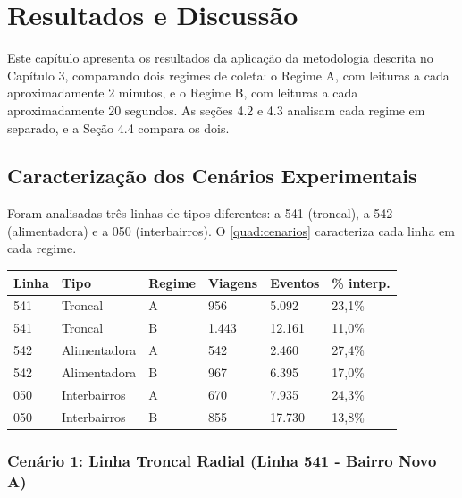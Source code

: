 
\chapter{Resultados e Discussão}\label{cap:resultados}

Este capítulo apresenta os resultados da aplicação da metodologia descrita no Capítulo 3, comparando dois regimes de coleta: o Regime A, com leituras a cada aproximadamente 2 minutos, e o Regime B, com leituras a cada aproximadamente 20 segundos. As seções 4.2 e 4.3 analisam cada regime em separado, e a Seção 4.4 compara os dois.

\section{Caracterização dos Cenários Experimentais}\label{sec:cenarios}

Foram analisadas três linhas de tipos diferentes: a 541 (troncal), a 542 (alimentadora) e a 050 (interbairros). O \autoref{quad:cenarios} caracteriza cada linha em cada regime.

\begin{tabframed}[htb]
\caption{Caracterização dos cenários experimentais}
\label{quad:cenarios}
\footnotesize
\begin{tabular}{|p{1.4cm}|p{2.8cm}|p{1.6cm}|p{1.8cm}|p{1.9cm}|p{1.9cm}|}
\hline
\textbf{Linha} & \textbf{Tipo} & \textbf{Regime} & \textbf{Viagens} & \textbf{Eventos} & \textbf{\% interp.} \\ \hline
541 & Troncal & A & 956 & 5.092 & 23,1\% \\ \hline
541 & Troncal & B & 1.443 & 12.161 & 11,0\% \\ \hline
542 & Alimentadora & A & 542 & 2.460 & 27,4\% \\ \hline
542 & Alimentadora & B & 967 & 6.395 & 17,0\% \\ \hline
050 & Interbairros & A & 670 & 7.935 & 24,3\% \\ \hline
050 & Interbairros & B & 855 & 17.730 & 13,8\% \\ \hline
\end{tabular}
\fonte{}
\end{tabframed}

\subsection{Cenário 1: Linha Troncal Radial (Linha 541 - Bairro Novo A)}\label{subsec:cenario541}

